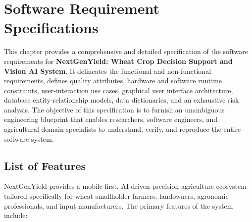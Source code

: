 \chapter{Software Requirement Specifications}
This chapter provides a comprehensive and detailed specification of the software requirements for \textbf{NextGenYield: Wheat Crop Decision Support and Vision AI System}. It delineates the functional and non-functional requirements, defines quality attributes, hardware and software runtime constraints, user-interaction use cases, graphical user interface architecture, database entity-relationship models, data dictionaries, and an exhaustive risk analysis. The objective of this specification is to furnish an unambiguous engineering blueprint that enables researchers, software engineers, and agricultural domain specialists to understand, verify, and reproduce the entire software system.

\section{List of Features}
NextGenYield provides a mobile-first, AI-driven precision agriculture ecosystem tailored specifically for wheat smallholder farmers, landowners, agronomic professionals, and input manufacturers. The primary features of the system include:

